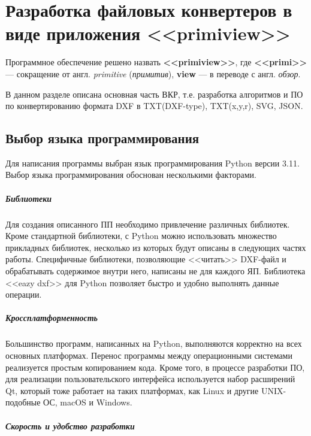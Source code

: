 \chapter{Разработка файловых конвертеров в виде приложения <<primiview>>}
\label{cha:entwickl}

Программное обеспечение решено назвать \textbf{<<primiview>>}, где \textbf{<<primi>>} --- сокращение от англ. \textit{primitive} (\textit{примитив}), \textbf{view} --- в переводе с англ. \textit{обзор}.

В данном разделе описана основная часть ВКР, т.е. разработка алгоритмов и ПО по конвертированию формата DXF в TXT(DXF-type), TXT(x,y,r), SVG, JSON.

\section{Выбор языка программирования}
Для написания программы выбран язык программирования Python версии 3.11. Выбор языка программирования обоснован несколькими факторами.

\paragraph{Библиотеки}
\nopagebreak

Для создания описанного ПП необходимо привлечение различных библиотек. Кроме стандартной библиотеки, с Python можно использовать множество прикладных библиотек, несколько из которых будут описаны в следующих частях работы. Специфичные библиотеки, позволяющие <<читать>> DXF-файл и обрабатывать содержимое внутри него, написаны не для каждого ЯП. Библиотека <<eazy dxf>> для Python позволяет быстро и удобно выполнять данные операции.

\paragraph{Кроссплатформенность}
\nopagebreak

Большинство программ, написанных на Python, выполняются корректно на всех основных платформах. Перенос программы между операционными системами реализуется простым копированием кода. Кроме того, в процессе разработки ПО, для реализации пользовательского интерфейса используется набор расширений Qt, который тоже работает на таких платформах, как Linux и другие UNIX-подобные ОС, macOS и Windows.

\paragraph{Скорость и удобство разработки} 
\nopagebreak

